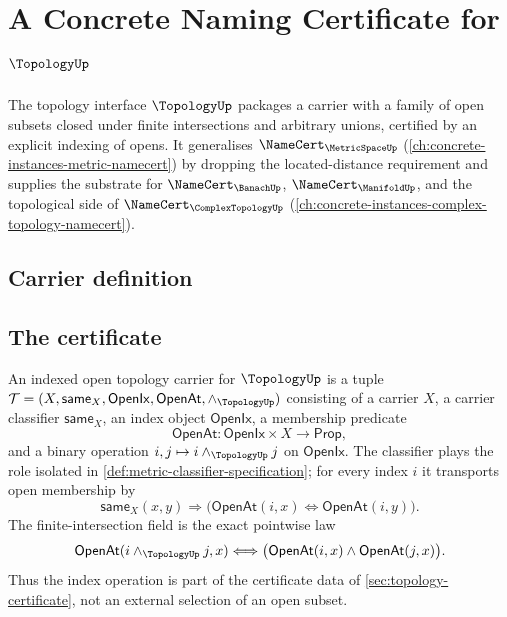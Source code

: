 \chapter{A Concrete Naming Certificate for $\TopologyUp$}
\label{ch:concrete-instances-topology-namecert}

The topology interface $\TopologyUp$ packages a carrier with a family of open subsets closed under finite intersections and arbitrary unions, certified by an explicit indexing of opens. It generalises $\NameCert_{\MetricSpaceUp}$ (\autoref{ch:concrete-instances-metric-namecert}) by dropping the located-distance requirement and supplies the substrate for $\NameCert_{\BanachUp}$, $\NameCert_{\ManifoldUp}$, and the topological side of $\NameCert_{\ComplexTopologyUp}$ (\autoref{ch:concrete-instances-complex-topology-namecert}).

\section{Carrier definition}
\label{sec:topology-carrier}

\section{The certificate}
\label{sec:topology-certificate}

\begin{definition}
\label{def:topology-indexed-open-carrier}
An indexed open topology carrier for $\TopologyUp$ is a tuple
$\mathcal{T}=(X,\mathsf{same}_X,\mathsf{OpenIx},\mathsf{OpenAt},\wedge_{\TopologyUp})$ consisting of a carrier $X$, a carrier classifier $\mathsf{same}_X$, an index object $\mathsf{OpenIx}$, a membership predicate
$$
\mathsf{OpenAt}:\mathsf{OpenIx}\times X\to\mathsf{Prop},
$$
and a binary operation $i,j\mapsto i\wedge_{\TopologyUp}j$ on $\mathsf{OpenIx}$. The classifier plays the role isolated in \autoref{def:metric-classifier-specification}; for every index $i$ it transports open membership by
$$
\mathsf{same}_X(x,y)
\Longrightarrow
\bigl(\mathsf{OpenAt}(i,x)\Longleftrightarrow\mathsf{OpenAt}(i,y)\bigr).
$$
The finite-intersection field is the exact pointwise law
$$
\mathsf{OpenAt}(i\wedge_{\TopologyUp}j,x)
\Longleftrightarrow
\bigl(\mathsf{OpenAt}(i,x)\wedge\mathsf{OpenAt}(j,x)\bigr).
$$
Thus the index operation is part of the certificate data of \autoref{sec:topology-certificate}, not an external selection of an open subset.
\end{definition}

